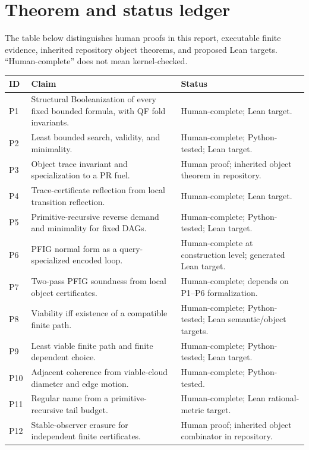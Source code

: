 \appendix
\section{Theorem and status ledger}
\label{app:ledger}

The table below distinguishes human proofs in this report, executable finite evidence, inherited repository object theorems, and proposed Lean targets.  ``Human-complete'' does not mean kernel-checked.

\small
\begin{longtable}{@{}>{\raggedright\arraybackslash}p{}>{\raggedright\arraybackslash}p{}>{\raggedright\arraybackslash}p{}@{}}
\toprule
ID & Claim & Status \\
\midrule
\endhead
P1 & Structural Booleanization of every fixed bounded formula, with QF fold invariants. & Human-complete; Lean target. \\
P2 & Least bounded search, validity, and minimality. & Human-complete; Python-tested; Lean target. \\
P3 & Object trace invariant and specialization to a PR fuel. & Human proof; inherited object theorem in repository. \\
P4 & Trace-certificate reflection from local transition reflection. & Human-complete; Lean target. \\
P5 & Primitive-recursive reverse demand and minimality for fixed DAGs. & Human-complete; Python-tested; Lean target. \\
P6 & PFIG normal form as a query-specialized encoded loop. & Human-complete at construction level; generated Lean target. \\
P7 & Two-pass PFIG soundness from local object certificates. & Human-complete; depends on P1--P6 formalization. \\
P8 & Viability iff existence of a compatible finite path. & Human-complete; Python-tested; Lean semantic/object targets. \\
P9 & Least viable finite path and finite dependent choice. & Human-complete; Python-tested; Lean target. \\
P10 & Adjacent coherence from viable-cloud diameter and edge motion. & Human-complete; Python-tested. \\
P11 & Regular name from a primitive-recursive tail budget. & Human-complete; Lean rational-metric target. \\
P12 & Stable-observer erasure for independent finite certificates. & Human proof; inherited object combinator in repository. \\

\end{longtable}
